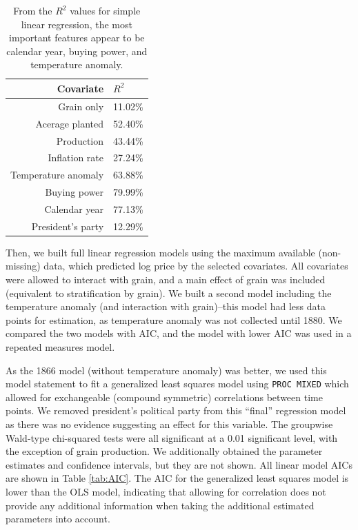 \documentclass[11pt]{article}
\begin{document}
\begin{table}[h!]
	\centering
	\begin{tabular}{rl}
		\toprule
		Covariate & $R^2$  \\
		\midrule
		Grain only & 11.02\%  \\
		Acerage planted & 52.40\%  \\
		Production & 43.44\%  \\
		Inflation rate & 27.24\% \\
		Temperature anomaly & 63.88\% \\
		Buying power & 79.99\% \\
		Calendar year & 77.13\% \\
		President's party & 12.29\% \\
		\bottomrule
	\end{tabular}
	\caption{From the $R^2$ values for simple linear regression, the most
	important features appear to be calendar year, buying power, and
	temperature anomaly.}
	\label{tab:SLR}
\end{table}

Then, we built full linear regression models using the maximum available
(non-missing) data, which predicted log price by the selected covariates. All
covariates were
allowed to interact with grain, and a main effect of grain was included
(equivalent to stratification by grain). We built a second model including the
temperature anomaly (and interaction with grain)--this model had less data
points for estimation, as temperature anomaly was not collected until 1880. We
compared the two models with AIC, and the model with lower AIC was used in a
repeated measures model.

As the 1866 model (without temperature anomaly) was better, we used this model
statement to fit a generalized least squares model using \texttt{PROC MIXED}
which allowed for exchangeable (compound symmetric) correlations between time
points. We removed president's political party from this ``final'' regression
model as there was no evidence suggesting an effect for this variable. The
groupwise Wald-type chi-squared tests were all significant at a 0.01
significant level, with the exception of grain production. We additionally
obtained the parameter estimates and confidence intervals, but they are not
shown. All linear model AICs are shown in Table \ref{tab:AIC}. The AIC for the
generalized least squares model is lower than the OLS model, indicating that
allowing for correlation does not provide any additional information when
taking the additional estimated parameters into account.
\end{document}
